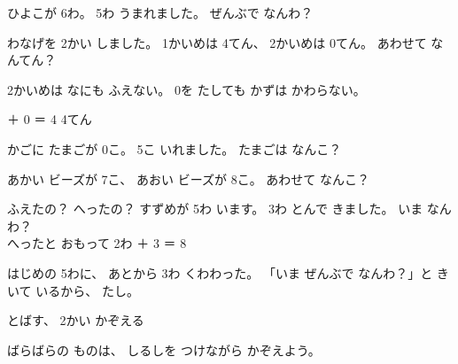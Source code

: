 \begin{jibun}
ひよこが 6わ。 5わ うまれました。 ぜんぶで なんわ？
\bkshikiran
{}
\end{jibun}

\begin{reidai}[0を たす]
わなげを 2かい しました。 1かいめは 4てん、 2かいめは 0てん。 あわせて なんてん？

\kangaekata 2かいめは なにも ふえない。 0を たしても かずは かわらない。

 ＋ 0 ＝ 4 \kotaenext 4てん
\end{reidai}

\begin{jibun}
かごに たまごが 0こ。 5こ いれました。 たまごは なんこ？
\bkshikiran
{}
\end{jibun}

\begin{jibun}
あかい ビーズが 7こ、 あおい ビーズが 8こ。 あわせて なんこ？
\bkshikiran
{}
\end{jibun}



\clearpage

\begin{tsumazuki}{ふえたの？ へったの？}
すずめが 5わ います。 3わ とんで きました。 いま なんわ？\\
\bkbatsu\enspace へったと おもって 2わ\hspace{2\zw}\bkmaru{} ＋ 3 ＝ 8\par
はじめの 5わに、 あとから 3わ くわわった。 「いま ぜんぶで なんわ？」と きいて いるから、 たし。
\end{tsumazuki}

\begin{tsumazuki}{とばす、 2かい かぞえる}
\begin{minipage}[c]{0.6\linewidth}
ばらばらの ものは、 しるしを つけながら かぞえよう。
\end{minipage}\hfill
\begin{minipage}[c]{0.36\linewidth}\centering
{}
\end{minipage}
\end{tsumazuki}

